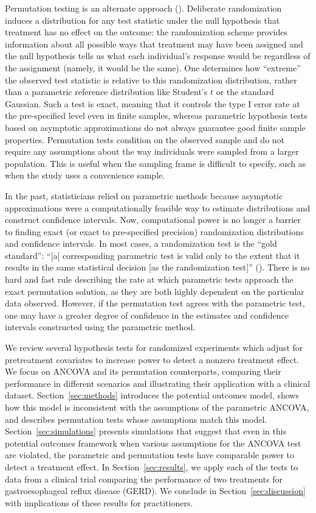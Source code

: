 \documentclass[12pt]{article}
\begin{document}
Permutation testing is an alternate approach (\cite{fisher_design_1935, pitman_significance_1937,pitman_significance_1938}).
Deliberate randomization induces a distribution for any test statistic under the null hypothesis that treatment has no effect on the outcome:
the randomization scheme provides information about all possible ways that treatment may have been assigned 
and the null hypothesis tells us what each individual's response would be regardless of the assignment (namely, it would be the same).
One determines how ``extreme'' the observed test statistic is relative to this randomization distribution, rather than a parametric reference distribution like Student's $t$ or the standard Gaussian.
Such a test is exact, meaning that it controls the type I error rate at the pre-specified level even in finite samples, whereas parametric hypothesis tests based on asymptotic approximations do not always guarantee good finite sample properties.
Permutation tests condition on the observed sample and do not require any assumptions about the way individuals were sampled from a larger population.
This is useful when the sampling frame is difficult to specify, such as when the study uses a convenience sample.

In the past, statisticians relied on parametric methods because asymptotic approximations were a computationally feasible way to estimate distributions and construct confidence intervals.
Now, computational power is no longer a barrier to finding exact (or exact to pre-specified precision) randomization distributions and confidence intervals.
In most cases, a randomization test is the ``gold standard'':
``[a] corresponding parametric test is valid only to the extent that it results in the same statistical decision [as the randomization test]'' (\cite{bradley_distribution_1968}).
There is no hard and fast rule describing the rate at which parametric tests approach the exact permutation solution, as they are both highly dependent on the particular data observed.
However, if the permutation test agrees with the parametric test, one may have a greater degree of confidence in the estimates and confidence intervals constructed using the parametric method.

We review several hypothesis tests for randomized experiments which adjust for pretreatment covariates to increase power to detect a nonzero treatment effect.  
We focus on ANCOVA and its permutation counterparts, comparing their performance in different scenarios and illustrating their application with a clinical dataset.
Section~\ref{sec:methods} introduces the potential outcomes model, shows how this model is inconsistent with the assumptions of the parametric ANCOVA, and describes permutation tests whose assumptions match this model.
Section~\ref{sec:simulations} presents simulations that suggest that even in this potential outcomes framework when various assumptions for the ANCOVA test are violated, the parametric and permutation tests have comparable power to detect a treatment effect.
In Section~\ref{sec:results}, we apply each of the tests to data from a clinical trial comparing the performance of two treatments for gastroesophageal reflux disease (GERD).
We conclude in Section~\ref{sec:discussion} with implications of these results for practitioners.
\end{document}
